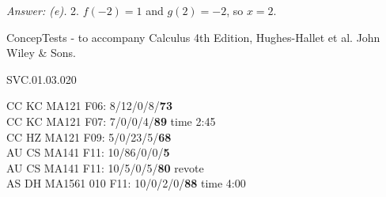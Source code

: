 {\it Answer: (e).} 2.  $f(-2) = 1$ and $g(2) = -2$, so $x=2$.

\medskip

ConcepTests - to accompany Calculus 4th Edition, Hughes-Hallet et al. John Wiley \& Sons.

SVC.01.03.020

CC KC MA121 F06: 8/12/0/8/{\bf 73} \\
CC KC MA121 F07: 7/0/0/4/{\bf 89} time 2:45\\
CC HZ MA121 F09: 5/0/23/5/{\bf68}  \\
AU CS MA141 F11: 10/86/0/0/{\bf5}  \\
AU CS MA141 F11: 10/5/0/5/{\bf80}   revote \\
AS DH MA1561 010 F11: 10/0/2/0/{\bf88} time 4:00  \\
